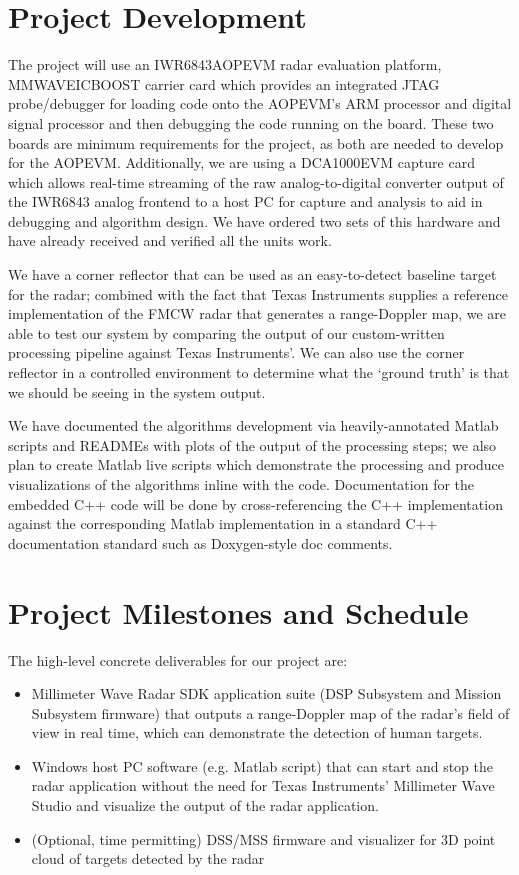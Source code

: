 \documentclass[12pt, oneside, titlepage, final]{article}
\begin{document}
	\section{Project Development}

	The project will use an IWR6843AOPEVM radar evaluation platform, MMWAVEICBOOST carrier card which
	provides an integrated JTAG probe/debugger for loading code onto the AOPEVM's ARM processor and
	digital signal processor and then debugging the code running on the board. These two boards are
	minimum requirements for the project, as both are needed to develop for the AOPEVM\@. Additionally, we
	are using a DCA1000EVM capture card which allows real-time streaming of the raw analog-to-digital
	converter output of the IWR6843 analog frontend to a host PC for capture and analysis to aid in
	debugging and algorithm design. We have ordered two sets of this hardware and have already received
	and verified all the units work.

	We have a corner reflector that can be used as an easy-to-detect baseline target for the radar;
	combined with the fact that Texas Instruments supplies a reference implementation of the FMCW radar
	that generates a range-Doppler map, we are able to test our system by comparing the output of our
	custom-written processing pipeline against Texas Instruments'. We can also use the corner reflector in
	a controlled environment to determine what the `ground truth' is that we should be seeing in the
	system output.

	We have documented the algorithms development via heavily-annotated Matlab scripts and READMEs with
	plots of the output of the processing steps; we also plan to create Matlab live scripts which
	demonstrate the processing and produce visualizations of the algorithms inline with the code.
	Documentation for the embedded C++ code will be done by cross-referencing the C++ implementation
	against the corresponding Matlab implementation in a standard C++ documentation standard such as
	Doxygen-style doc comments.

	\section{Project Milestones and Schedule}

	The high-level concrete deliverables for our project are:

	\begin{itemize}
		\item Millimeter Wave Radar SDK application suite (DSP Subsystem and Mission Subsystem
			firmware) that outputs a range-Doppler map of the radar's field of view in real time,
			which can demonstrate the detection of human targets.
		\item Windows host PC software (e.g. Matlab script) that can start and stop the radar
			application without the need for Texas Instruments' Millimeter Wave Studio and
			visualize the output of the radar application.
		\item (Optional, time permitting) DSS/MSS firmware and visualizer for 3D point cloud of
			targets detected by the radar
	\end{itemize}
\end{document}
